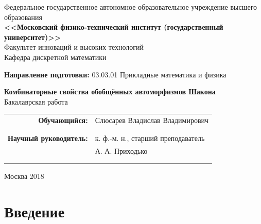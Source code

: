 \documentclass[14pt, a4paper, russian]{report}
\begin{document}
\begin{center}
\hfill \break
\footnotesize{Федеральное государственное автономное образовательное учреждение 
высшего образования}\\ 
\small{\textbf{<<Московский физико-технический институт (государственный университет)>>}}\\
\hfill \break
\normalsize{Факультет инноваций и высоких технологий}\\
\normalsize{Кафедра дискретной математики}\\
\end{center}
\footnotesize{\textbf{Направление подготовки:} 03.03.01 Прикладные математика и физика}\\
\hfill \break
\hfill \break
\hfill \break
\hfill \break
\begin{center}
\large{\textbf{Комбинаторные свойства обобщённых автоморфизмов Шакона}}\\
\normalsize{Бакалаврская работа}\\
\hfill \break
\hfill \break
\end{center}
 
\hfill \break
 
\begin{flushright}
\footnotesize{ 
\begin{tabular}{rl}
\textbf{Обучающийся:} & Слюсарев Владислав Владимирович \\
 & \underline{\hspace{3cm}} \\\\
\textbf{Научный руководитель:} & к. ф.-м. н., старший преподаватель\\
            & А. А. Приходько \\
 & \underline{\hspace{3cm}} \\\\
\end{tabular}
}
\end{flushright}

\hfill \break
\hfill \break
\hfill \break
\hfill \break
\hfill \break
\hfill \break
\begin{center} Москва 2018 \end{center}
\thispagestyle{empty} %
 
 
\newpage

\tableofcontents{}

\chapter*{Введение}
\end{document}
